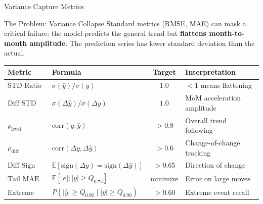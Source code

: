 \documentclass[aspectratio=169,10pt]{beamer}
\begin{document}
\begin{frame}{Variance Capture Metrics}
\begin{block}{The Problem: Variance Collapse}
\footnotesize
Standard metrics (RMSE, MAE) can mask a critical failure: the model predicts the general trend but \textbf{flattens month-to-month amplitude}. The prediction series has lower standard deviation than the actual.
\end{block}

\vspace{0.2cm}
\begin{center}
\scriptsize
\begin{tabular}{@{}llcl@{}}
\toprule
\textbf{Metric} & \textbf{Formula} & \textbf{Target} & \textbf{Interpretation} \\
\midrule
$\text{STD Ratio}$ & $\sigma(\hat{y}) / \sigma(y)$ & $1.0$ & $< 1$ means flattening \\
$\text{Diff STD Ratio}$ & $\sigma(\Delta\hat{y}) / \sigma(\Delta y)$ & $1.0$ & MoM acceleration amplitude \\
$\rho_{\text{level}}$ & $\text{corr}(y, \hat{y})$ & $> 0.8$ & Overall trend following \\
$\rho_{\text{diff}}$ & $\text{corr}(\Delta y, \Delta \hat{y})$ & $> 0.6$ & Change-of-change tracking \\
$\text{Diff Sign Acc}$ & $\mathbb{E}[\text{sign}(\Delta y) = \text{sign}(\Delta \hat{y})]$ & $> 0.65$ & Direction of change \\
$\text{Tail MAE}$ & $\mathbb{E}[|e|; |y| \ge Q_{0.75}]$ & minimize & Error on large moves \\
$\text{Extreme Hit}$ & $P(|\hat{y}| \ge Q_{0.90} \mid |y| \ge Q_{0.90})$ & $> 0.60$ & Extreme event recall \\
\bottomrule
\end{tabular}
\end{center}
\end{frame}
\end{document}
